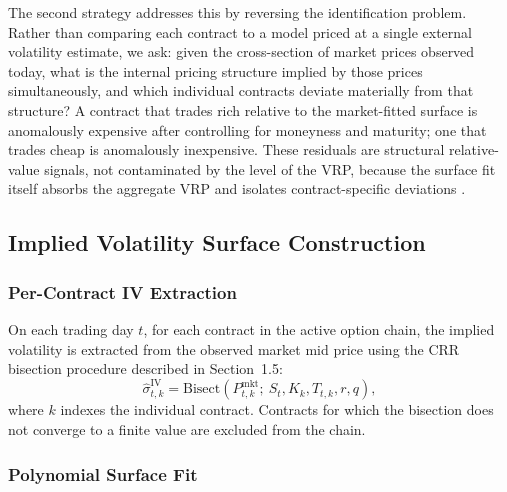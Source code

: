 \documentclass[10pt,twocolumn]{article}
\begin{document}
The second strategy addresses this by reversing the identification problem.
Rather than comparing each contract to a model priced at a single external
volatility estimate, we ask: given the cross-section of market prices observed
today, what is the internal pricing structure implied by those prices
simultaneously, and which individual contracts deviate materially from that
structure? A contract that trades rich relative to the market-fitted surface
is anomalously expensive after controlling for moneyness and maturity; one
that trades cheap is anomalously inexpensive. These residuals are structural
relative-value signals, not contaminated by the level of the VRP, because
the surface fit itself absorbs the aggregate VRP and isolates
contract-specific deviations \cite{gatheral2006, broadie2009}.

\subsection{Implied Volatility Surface Construction}
\label{sec:surface_construction}

\subsubsection{Per-Contract IV Extraction}

On each trading day $t$, for each contract in the active option chain, the
implied volatility is extracted from the observed market mid price using the
CRR bisection procedure described in Section~1.5:
%
\begin{equation}
\hat{\sigma}_{t,k}^{\text{IV}} = \text{Bisect}\!\left(
  P_{t,k}^{\text{mkt}};\ S_t, K_k, T_{t,k}, r, q
\right),
\end{equation}
%
where $k$ indexes the individual contract. Contracts for which the bisection
does not converge to a finite value are excluded from the chain.

\subsubsection{Polynomial Surface Fit}
\end{document}
